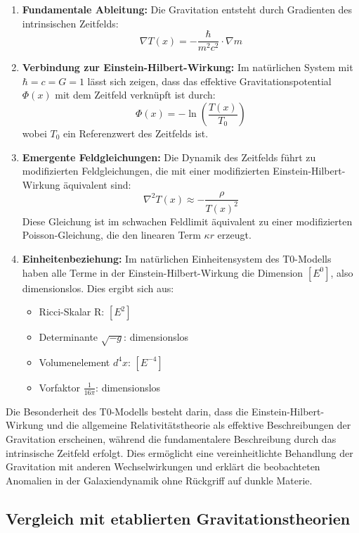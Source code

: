\documentclass[12pt,a4paper]{article}
\begin{document}
	\begin{enumerate}
		\item \textbf{Fundamentale Ableitung:} Die Gravitation entsteht durch Gradienten des intrinsischen Zeitfelds:
		\[
		\nabla T(x) = -\frac{\hbar}{m^2c^2} \cdot \nabla m
		\]
		
		\item \textbf{Verbindung zur Einstein-Hilbert-Wirkung:} Im natürlichen System mit $\hbar = c = G = 1$ lässt sich zeigen, dass das effektive Gravitationspotential $\Phi(x)$ mit dem Zeitfeld verknüpft ist durch:
		\[
		\Phi(x) = -\ln\left(\frac{T(x)}{T_0}\right)
		\]
		wobei $T_0$ ein Referenzwert des Zeitfelds ist.
		
		\item \textbf{Emergente Feldgleichungen:} Die Dynamik des Zeitfelds führt zu modifizierten Feldgleichungen, die mit einer modifizierten Einstein-Hilbert-Wirkung äquivalent sind:
		\[
		\nabla^2T(x) \approx -\frac{\rho}{T(x)^2}
		\]
		Diese Gleichung ist im schwachen Feldlimit äquivalent zu einer modifizierten Poisson-Gleichung, die den linearen Term $\kappa r$ erzeugt.
		
		\item \textbf{Einheitenbeziehung:} Im natürlichen Einheitensystem des T0-Modells haben alle Terme in der Einstein-Hilbert-Wirkung die Dimension $[E^0]$, also dimensionslos. Dies ergibt sich aus:
		\begin{itemize}
			\item Ricci-Skalar R: $[E^2]$
			\item Determinante $\sqrt{-g}$: dimensionslos
			\item Volumenelement $d^4x$: $[E^{-4}]$
			\item Vorfaktor $\frac{1}{16\pi}$: dimensionslos
		\end{itemize}
	\end{enumerate}
	
	Die Besonderheit des T0-Modells besteht darin, dass die Einstein-Hilbert-Wirkung und die allgemeine Relativitätstheorie als effektive Beschreibungen der Gravitation erscheinen, während die fundamentalere Beschreibung durch das intrinsische Zeitfeld erfolgt. Dies ermöglicht eine vereinheitlichte Behandlung der Gravitation mit anderen Wechselwirkungen und erklärt die beobachteten Anomalien in der Galaxiendynamik ohne Rückgriff auf dunkle Materie.

\subsection*{Vergleich mit etablierten Gravitationstheorien}
\end{document}
